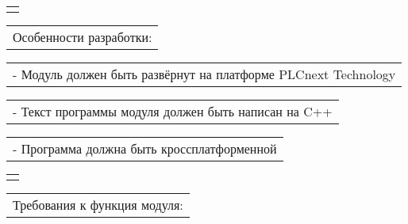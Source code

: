 \documentclass[12pt, А4, twoside]{article}
\begin{document}
\begin{FlushLeft}
    \begin{tabular}{p{17.25cm}}
        \vspace{0pt} \hline \\
    \end{tabular}

    \vspace{-0.1 cm}

    \begin{tabular}{p{17.25cm}}
        \hspace{0.3cm} \textsf{Особенности разработки:} \vspace{0pt} \hline \\
    \end{tabular}

    \vspace{-0.1 cm}

    \begin{tabular}{p{17.25cm}}
        \hspace{0.6cm} \textsf{- Модуль должен быть развёрнут на платформе PLCnext Technology} \vspace{0pt} \hline \\
    \end{tabular}

    \vspace{-0.1 cm}

    \begin{tabular}{p{17.25cm}}
        \hspace{0.6cm} \textsf{- Текст программы модуля должен быть написан на C++}\vspace{0pt} \hline \\
    \end{tabular}

    \vspace{-0.1 cm}

    \begin{tabular}{p{17.25cm}}
        \hspace{0.6cm} \textsf{- Программа должна быть кроссплатформенной}\vspace{0pt} \hline 
    \end{tabular}

    \begin{tabular}{p{17.25cm}}
        \vspace{0pt} \hline \\
    \end{tabular}

    \vspace{-0.1 cm}

    \begin{tabular}{p{17.25cm}}
        \hspace{0.3cm} \textsf{Требования к функция модуля:} \vspace{0pt} \hline \\
    \end{tabular}


\end{FlushLeft}
\end{document}
